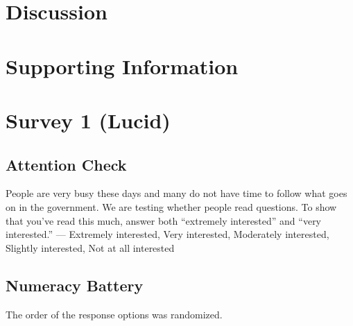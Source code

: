 \documentclass[12pt, letterpaper]{article}
\begin{document}
\section*{Discussion}

\clearpage


\clearpage

\appendix
\renewcommand{\thesection}{SI \arabic{section}}
\renewcommand\thetable{\thesection.\arabic{table}}  
\renewcommand\thefigure{\thesection.\arabic{figure}}

\section*{Supporting Information}\label{si}

\section{Survey 1 (Lucid)}

\subsection{Attention Check}
People are very busy these days and many do not have time to follow what goes on in the government. We are testing whether people read questions. To show that you've read this much, answer both ``extremely interested'' and ``very interested.'' --- Extremely interested, Very interested, Moderately interested,  Slightly interested, Not at all interested

\subsection{Numeracy Battery}

The order of the response options was randomized.
\end{document}
